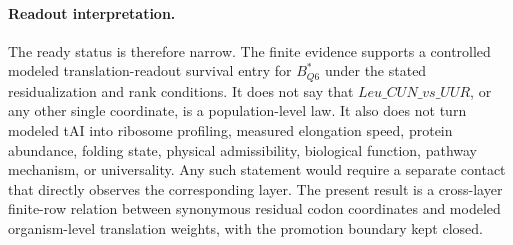 \paragraph{Readout interpretation.}
The ready status is therefore narrow. The finite evidence supports a controlled modeled translation-readout survival entry for $B^\ast_{Q6}$ under the stated residualization and rank conditions. It does not say that $Leu\_CUN\_vs\_UUR$, or any other single coordinate, is a population-level law. It also does not turn modeled tAI into ribosome profiling, measured elongation speed, protein abundance, folding state, physical admissibility, biological function, pathway mechanism, or universality. Any such statement would require a separate contact that directly observes the corresponding layer. The present result is a cross-layer finite-row relation between synonymous residual codon coordinates and modeled organism-level translation weights, with the promotion boundary kept closed.

